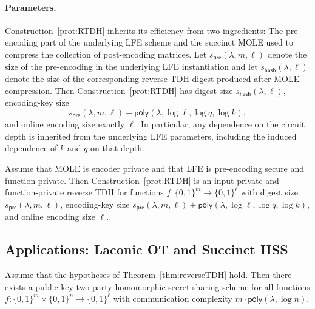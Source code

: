 \documentclass{theoretics}
\newcommand{\poly}{\mathsf{poly}}
\begin{document}
{\paragraph{Parameters.} Construction~\ref{prot:RTDH}
inherits its efficiency from two ingredients: The pre-encoding part of the
underlying LFE scheme and the succinct MOLE used to compress the collection of
post-encoding matrices. Let
$s_{\mathsf{pre}}(\lambda,m,\ell)$
denote the size of the pre-encoding in the underlying LFE instantiation and let
$s_{\mathsf{hash}}(\lambda,\ell)$
denote the size of the corresponding reverse-TDH digest produced after MOLE
compression. Then Construction~\ref{prot:RTDH} has digest size
$s_{\mathsf{hash}}(\lambda,\ell)$,
encoding-key size
\[
s_{\mathsf{pre}}(\lambda,m,\ell)
+\poly(\lambda,\log \ell,\log q,\log k),
\]
and online encoding size exactly $\ell$. In particular, any dependence on the circuit depth is inherited from the
underlying LFE parameters, including the induced dependence of $k$ and $q$ on
that depth.}

{
\begin{theorem}\label{thm:reverseTDH}
Assume that MOLE is encoder private and that LFE is pre-encoding secure and
function private. Then Construction~\ref{prot:RTDH} is an input-private
and function-private reverse TDH for functions
$f:\{0,1\}^m\to\{0,1\}^\ell$ with digest size $s_{\mathsf{pre}}(\lambda,m,\ell)$,
encoding-key size
$s_{\mathsf{pre}}(\lambda,m,\ell)
+\poly(\lambda,\log \ell,\log q,\log k)$,
and online encoding size $\ell$.
\end{theorem}}

{\subsection{Applications: Laconic OT and Succinct HSS}}


{\begin{theorem}
Assume that the hypotheses of Theorem~\ref{thm:reverseTDH} hold.  Then there exists a
public-key two-party homomorphic secret-sharing scheme for all functions
$f : \{0,1\}^{m} \times \{0,1\}^{n} \to \{0,1\}^{\ell}$
with communication complexity $m \cdot \poly(\lambda,\log n)$.
\end{theorem}}
\end{document}
